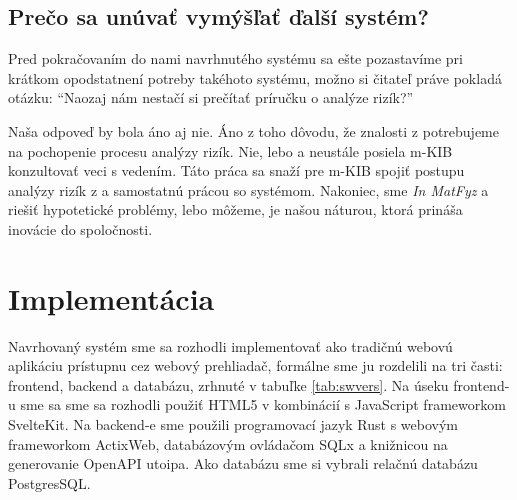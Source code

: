 \subsection*{Prečo sa unúvať vymýšľať ďalší systém?}

Pred pokračovaním do nami navrhnutého systému sa ešte pozastavíme pri krátkom opodstatnení potreby takéhoto systému, možno si čitateľ
práve pokladá otázku: \enquote{Naozaj nám nestačí si prečítať príručku \cite{BSI3} o analýze rizík?}

Naša odpoveď by bola áno aj nie. Áno z toho dôvodu, že znalosti z \cite{BSI3} potrebujeme na pochopenie procesu analýzy rizík. Nie,
lebo \cite{BSI3} a \cite{GSK} neustále posiela m-KIB konzultovať veci s vedením. Táto práca sa snaží pre m-KIB spojiť postupu analýzy
rizík z \cite{BSI3} a samostatnú prácou so systémom. Nakoniec, sme \emph{In MatFyz} a riešiť hypotetické problémy, lebo môžeme, je
našou náturou, ktorá prináša inovácie do spoločnosti.

\section{Implementácia}

Navrhovaný systém sme sa rozhodli implementovať ako tradičnú webovú aplikáciu prístupnu cez webový prehliadač, formálne sme ju rozdelili na tri
časti: frontend, backend a databázu, zrhnuté v tabuľke \ref{tab:swvers}. Na úseku frontend-u sme sa sme sa rozhodli použiť HTML5 v kombinácií s JavaScript frameworkom SvelteKit.
Na backend-e sme použili programovací jazyk Rust s webovým frameworkom ActixWeb, databázovým ovládačom SQLx a knižnicou na generovanie OpenAPI utoipa.
Ako databázu sme si vybrali relačnú databázu PostgresSQL.


